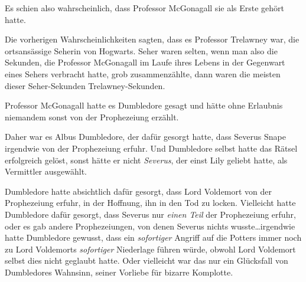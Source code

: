 Es schien also wahrscheinlich, dass Professor McGonagall sie als Erste gehört hatte.

Die vorherigen Wahrscheinlichkeiten sagten, dass es Professor Trelawney war, die ortsansässige Seherin von Hogwarts. Seher waren selten, wenn man also die Sekunden, die Professor McGonagall im Laufe ihres Lebens in der Gegenwart eines Sehers verbracht hatte, grob zusammenzählte, dann waren die meisten dieser Seher-Sekunden Trelawney-Sekunden.

Professor McGonagall hatte es Dumbledore gesagt und hätte ohne Erlaubnis niemandem sonst von der Prophezeiung erzählt.

Daher war es Albus Dumbledore, der dafür gesorgt hatte, dass Severus Snape irgendwie von der Prophezeiung erfuhr. Und Dumbledore selbst hatte das Rätsel erfolgreich gelöst, sonst hätte er nicht \emph{Severus}, der einst Lily geliebt hatte, als Vermittler ausgewählt.

Dumbledore hatte absichtlich dafür gesorgt, dass Lord Voldemort von der Prophezeiung erfuhr, in der Hoffnung, ihn in den Tod zu locken. Vielleicht hatte Dumbledore dafür gesorgt, dass Severus nur \emph{einen Teil} der Prophezeiung erfuhr, oder es gab andere Prophezeiungen, von denen Severus nichts wusste…irgendwie hatte Dumbledore gewusst, dass ein \emph{sofortiger} Angriff auf die Potters immer noch zu Lord Voldemorts \emph{sofortiger} Niederlage führen würde, obwohl Lord Voldemort selbst dies nicht geglaubt hatte. Oder vielleicht war das nur ein Glücksfall von Dumbledores Wahnsinn, seiner Vorliebe für bizarre Komplotte.

